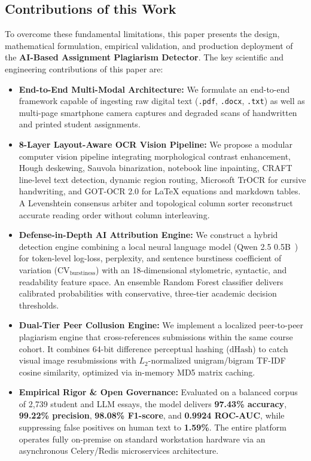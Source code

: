 \documentclass[journal]{IEEEtran}
\begin{document}
\subsection{Contributions of this Work}
To overcome these fundamental limitations, this paper presents the design, mathematical formulation, empirical validation, and production deployment of the \textbf{AI-Based Assignment Plagiarism Detector}. The key scientific and engineering contributions of this paper are:
\begin{itemize}
    \item \textbf{End-to-End Multi-Modal Architecture:} We formulate an end-to-end framework capable of ingesting raw digital text (\texttt{.pdf}, \texttt{.docx}, \texttt{.txt}) as well as multi-page smartphone camera captures and degraded scans of handwritten and printed student assignments.
    \item \textbf{8-Layer Layout-Aware OCR Vision Pipeline:} We propose a modular computer vision pipeline integrating morphological contrast enhancement, Hough deskewing, Sauvola binarization, notebook line inpainting, CRAFT line-level text detection, dynamic region routing, Microsoft TrOCR for cursive handwriting, and GOT-OCR 2.0 for \LaTeX{} equations and markdown tables. A Levenshtein consensus arbiter and topological column sorter reconstruct accurate reading order without column interleaving.
    \item \textbf{Defense-in-Depth AI Attribution Engine:} We construct a hybrid detection engine combining a local neural language model (Qwen 2.5 0.5B~\cite{yang2024qwen25}) for token-level log-loss, perplexity, and sentence burstiness coefficient of variation ($\text{CV}_{\text{burstiness}}$) with an 18-dimensional stylometric, syntactic, and readability feature space. An ensemble Random Forest classifier delivers calibrated probabilities with conservative, three-tier academic decision thresholds.
    \item \textbf{Dual-Tier Peer Collusion Engine:} We implement a localized peer-to-peer plagiarism engine that cross-references submissions within the same course cohort. It combines 64-bit difference perceptual hashing ($\text{dHash}$) to catch visual image resubmissions with $L_2$-normalized unigram/bigram TF-IDF cosine similarity, optimized via in-memory MD5 matrix caching.
    \item \textbf{Empirical Rigor \& Open Governance:} Evaluated on a balanced corpus of 2,739 student and LLM essays, the model delivers \textbf{97.43\% accuracy}, \textbf{99.22\% precision}, \textbf{98.08\% F1-score}, and \textbf{0.9924 ROC-AUC}, while suppressing false positives on human text to \textbf{1.59\%}. The entire platform operates fully on-premise on standard workstation hardware via an asynchronous Celery/Redis microservices architecture.
\end{itemize}
\end{document}
